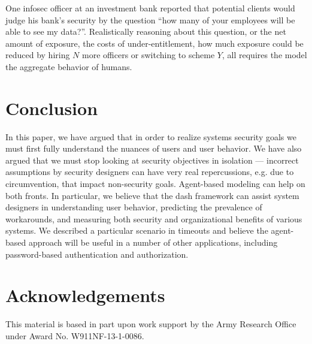 \documentclass{acm_proc_article-sp}
\newcommand{\ignore}[1] {}
\begin{document}
One infosec officer at an investment bank reported that potential
clients would judge his bank's security by the question ``how many of
your employees will be able to see my data?''.  Realistically
reasoning about this question, or the net amount of exposure, the
costs of under-entitlement, how much exposure could be reduced by
hiring $N$ more officers or switching to scheme $Y$, all requires the
model the aggregate behavior of humans.



\ignore{(Indeed, X.509 PKI has often been lamented as costing too many
man-hours when deployed in practice, in large enterprises.  Could our
approach help explain this, and then help guide designers to reduce
these costs?)}

\ignore{BCMA....}

\section{Conclusion}
\label{sec-conclusion}

In this paper, we have argued that in order to realize systems
security goals we must first fully understand the nuances of users and
user behavior.  We have also argued that we must stop looking at
security objectives in isolation --- incorrect assumptions by security
designers can have very real repercussions, e.g. due to circumvention,
that impact non-security goals. Agent-based modeling can help on both
fronts. In particular, we believe that the {\sc dash} framework can
assist system designers in understanding user behavior, predicting the
prevalence of workarounds, and measuring both security and
organizational benefits of various systems. We described a particular
scenario in timeouts and believe the agent-based approach will be
useful in a number of other applications, including password-based
authentication and authorization.

\section{Acknowledgements}
\label{sec-acks}

This material is based in part upon work support by the Army Research
Office under Award No. {\small W911NF-13-1-0086}.

\small

\nocite{*}



\end{document}
